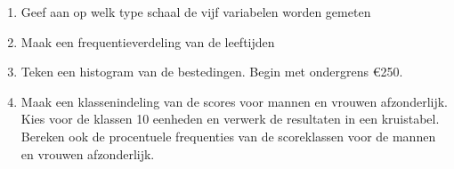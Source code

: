 \begin{enumerate}[label=(\alph*)]
    \item Geef aan op welk type schaal de vijf variabelen worden gemeten

    \item Maak een frequentieverdeling van de leeftijden
    \item Teken een histogram van de bestedingen. Begin met ondergrens \euro 250.
    \item Maak een klassenindeling van de scores voor mannen en vrouwen afzonderlijk. 
    Kies voor de klassen 10 eenheden en verwerk de resultaten in een kruistabel. 
    Bereken ook de procentuele frequenties van de scoreklassen voor de mannen en vrouwen afzonderlijk.
\end{enumerate}
